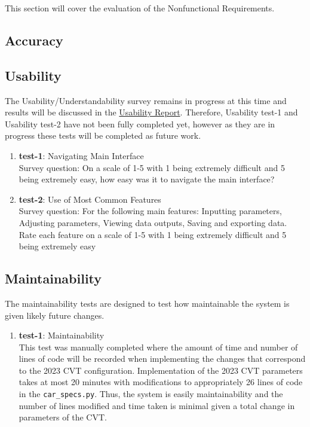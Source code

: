 \documentclass[12pt, titlepage]{article}
\begin{document}
This section will cover the evaluation of the Nonfunctional Requirements. 

\subsection{Accuracy}
		
\subsection{Usability}
The Usability/Understandability survey remains in progress at this time and results will be discussed in the \href{file:../UsabilityReport/UsabilityReport.pdf}{Usability Report}. 
Therefore, Usability test-1 and Usability test-2 have not been fully completed yet, however as they are in progress these tests will be completed as future work. 

\begin{enumerate}
\item{\textbf{test-1}: Navigating Main Interface}\\
Survey question: On a scale of 1-5 with 1 being extremely difficult and 5 being extremely easy, how easy was it to navigate the main interface? 
\item{\textbf{test-2}: Use of Most Common Features}\\
Survey question: For the following main features: Inputting parameters, Adjusting parameters, Viewing data outputs, Saving and exporting data. 
Rate each feature on a scale of 1-5 with 1 being extremely difficult and 5 being extremely easy
\end{enumerate}

\subsection{Maintainability}
The maintainability tests are designed to test how maintainable the system is given likely future changes.
\begin{enumerate}
\item{\textbf{test-1}: Maintainability}\\
This test was manually completed where the amount of time and number of lines of code
will be recorded when implementing the changes that correspond to the 2023 CVT configuration. 
Implementation of the 2023 CVT parameters takes at most 20 minutes with modifications to appropriately 26 lines of code in the \texttt{car\_specs.py}.
Thus, the system is easily maintainability and the number of lines modified and time taken is minimal given a total change in parameters of the CVT. 
\end{enumerate}
\end{document}
